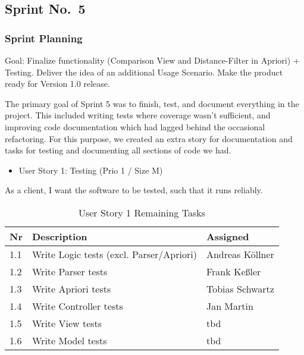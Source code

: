 
\subsection{Sprint No.~5}


\subsubsection*{Sprint Planning}

Goal: Finalize functionality (Comparison View and Distance-Filter in Apriori) + Testing.
Deliver the idea of an additional Usage Scenario.
Make the product ready for Version 1.0 release.

The primary goal of Sprint 5 was to finish, test, and document everything in the project. This included writing tests where coverage wasn't sufficient, and improving code documentation which had lagged behind the occasional refactoring. For this purpose, we created an extra story for documentation and tasks for testing and documenting all sections of code we had.

\begin{itemize}
	\item User Story 1: Testing (Prio 1 / Size M)
	\end{itemize}
As a client,
I want the software to be tested,
such that it runs reliably.
\begin{table}[h]
  \caption{User Story 1 Remaining Tasks}
  \label{Story 1 Tasks}
  \centering
  \begin{tabular}{p{1cm}|p{5cm}|p{3cm}|}
  	Nr & Description & Assigned \\ 
  	\hline
  	1.1 & Write Logic tests (excl. Parser/Apriori) & Andreas Köllner \\ 
  	\hline
  	1.2 & Write Parser tests & Frank Keßler \\ 
  	\hline
  	1.3 & Write Apriori tests & Tobias Schwartz \\ 
  	\hline
  	1.4 & Write Controller tests &  Jan Martin \\ 
  	\hline
  	1.5 & Write View tests &  tbd \\ 
  	\hline
  	1.6 & Write Model tests &  tbd \\ 
  	\hline
  \end{tabular}
\end{table}

